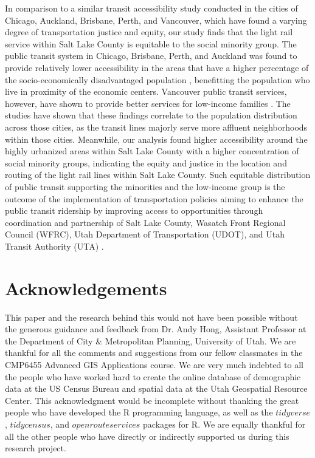 \documentclass[numbered]{trbunofficial}
\begin{document}
In comparison to a similar transit accessibility study conducted in the cities of Chicago, Auckland, Brisbane, Perth, and Vancouver, which have found a varying degree of transportation justice and equity, our study finds that the light rail service within Salt Lake County is equitable to the social minority group. The public transit system in Chicago, Brisbane, Perth, and Auckland was found to provide relatively lower accessibility in the areas that have a higher percentage of the socio-economically disadvantaged population \cite{Ermagun2020,NazariAdli2019}, benefitting the population who live in proximity of the economic centers. Vancouver public transit services, however, have shown to provide better services for low-income families \cite{NazariAdli2019}. The studies have shown that these findings correlate to the population distribution across those cities, as the transit lines majorly serve more affluent neighborhoods within those cities. Meanwhile, our analysis found higher accessibility around the highly urbanized areas within Salt Lake County with a higher concentration of social minority groups, indicating the equity and justice in the location and routing of the light rail lines within Salt Lake County. Such equitable distribution of public transit supporting the minorities and the low-income group is the outcome of the implementation of transportation policies aiming to enhance the public transit ridership by improving access to opportunities through coordination and partnership of Salt Lake County, Wasatch Front Regional Council (WFRC), Utah Department of Transportation (UDOT), and Utah Transit Authority (UTA) \cite{WasatchFrontRegionalCouncil}.


\section{Acknowledgements}

This paper and the research behind this would not have been possible without the generous guidance and feedback from Dr. Andy Hong, Assistant Professor at the Department of City \& Metropolitan Planning, University of Utah. We are thankful for all the comments and suggestions from our fellow classmates in the CMP6455 Advanced GIS Applications course. We are very much indebted to all the people who have worked hard to create the online database of demographic data at the US Census Bureau and spatial data at the Utah Geospatial Resource Center. This acknowledgment would be incomplete without thanking the great people who have developed the R programming language, as well as the $tidyverse$, $tidycensus$, and $openrouteservices$ packages for R. We are equally thankful for all the other people who have directly or indirectly supported us during this research project.
\end{document}
